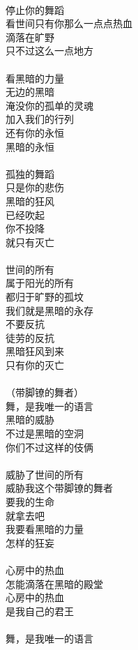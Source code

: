 \\
停止你的舞蹈\\
看世间只有你那么一点点热血\\
滴落在旷野\\
只不过这么一点地方\\
\\
看黑暗的力量\\
无边的黑暗\\
淹没你的孤单的灵魂\\
加入我们的行列\\
还有你的永恒\\
黑暗的永恒\\
\\
孤独的舞蹈\\
只是你的悲伤\\
黑暗的狂风\\
已经吹起\\
你不投降\\
就只有灭亡\\
\\
世间的所有\\
属于阳光的所有\\
都归于旷野的孤坟\\
我们就是黑暗的永存\\
不要反抗\\
徒劳的反抗\\
黑暗狂风到来\\
只有你的灭亡\\
\\
（带脚镣的舞者）\\
舞，是我唯一的语言\\
黑暗的威胁\\
不过是黑暗的空洞\\
你们不过这样的伎俩\\
\\
威胁了世间的所有\\
威胁我这个带脚镣的舞者\\
要我的生命\\
就拿去吧\\
我要看黑暗的力量\\
怎样的狂妄\\
\\
心房中的热血\\
怎能滴落在黑暗的殿堂\\
心房中的热血\\
是我自己的君王\\
\\
舞，是我唯一的语言\\
